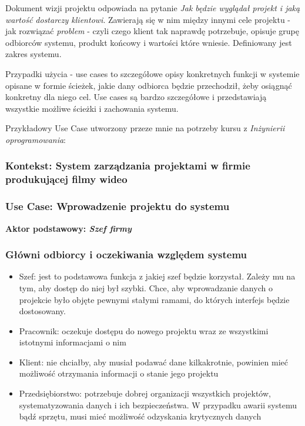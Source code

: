 \documentclass{article}
\begin{document}
Dokument wizji projektu odpowiada na pytanie \textit{Jak będzie wyglądał projekt i jaką wartość dostarczy klientowi}. Zawierają się w nim między innymi cele projektu - jak rozwiązać \textit{problem} - czyli czego klient tak naprawdę potrzebuje, opisuje grupę odbiorców systemu, produkt końcowy i wartości które wniesie. Definiowany jest zakres systemu.

Przypadki użycia - use cases to szczegółowe opisy konkretnych funkcji w systemie opisane w formie ścieżek, jakie dany odbiorca będzie przechodził, żeby osiągnąć konkretny dla niego cel. Use cases są bardzo szczegółowe i przedstawiają wszystkie możliwe ścieżki i zachowania systemu.

Przykładowy Use Case utworzony przeze mnie na potrzeby kursu z \textit{Inżynierii oprogramowania}:

\subsubsection*{Kontekst: System zarządzania projektami w firmie produkującej filmy wideo}
\subsubsection*{Use Case: Wprowadzenie projektu do systemu}
\textbf{Aktor podstawowy: \textit{Szef firmy}}

\subsubsection*{Główni odbiorcy i oczekiwania względem systemu}
\begin{itemize}
    \item Szef: jest to podstawowa funkcja z jakiej szef będzie korzystał. Zależy mu na tym, aby dostęp do niej był szybki. Chce, aby wprowadzanie danych o projekcie było objęte pewnymi stałymi ramami, do których interfejs będzie dostosowany.
    \item Pracownik: oczekuje dostępu do nowego projektu wraz ze wszystkimi istotnymi informacjami o nim
    \item Klient: nie chciałby, aby musiał podawać dane kilkakrotnie, powinien mieć możliwość otrzymania informacji o stanie jego projektu
    \item Przedsiębiorstwo: potrzebuje dobrej organizacji wszystkich projektów, systematyzowania danych i ich bezpieczeństwa. W przypadku awarii systemu bądź sprzętu, musi mieć możliwość odzyskania krytycznych danych
\end{itemize}
\end{document}
